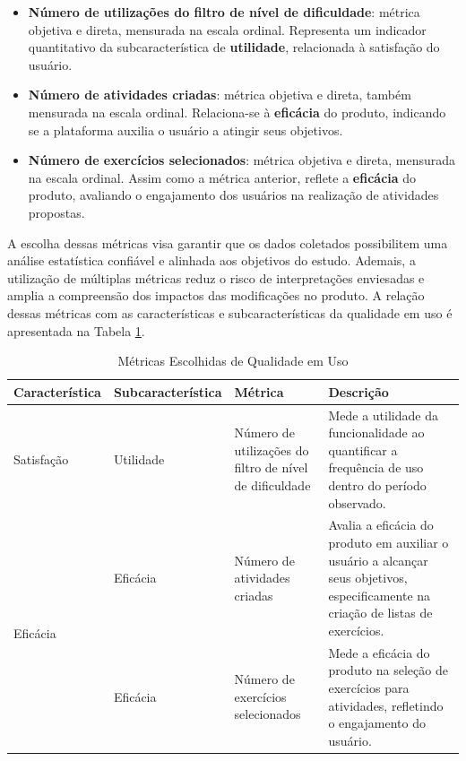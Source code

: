 \begin{itemize}
  \item \textbf{Número de utilizações do filtro de nível de dificuldade}: métrica objetiva e direta, mensurada na escala ordinal. Representa um indicador quantitativo da subcaracterística de \textbf{utilidade}, relacionada à satisfação do usuário.
  \item \textbf{Número de atividades criadas}: métrica objetiva e direta, também mensurada na escala ordinal. Relaciona-se à \textbf{eficácia} do produto, indicando se a plataforma auxilia o usuário a atingir seus objetivos.
  \item \textbf{Número de exercícios selecionados}: métrica objetiva e direta, mensurada na escala ordinal. Assim como a métrica anterior, reflete a \textbf{eficácia} do produto, avaliando o engajamento dos usuários na realização de atividades propostas.
\end{itemize}

A escolha dessas métricas visa garantir que os dados coletados possibilitem uma análise estatística confiável e alinhada aos objetivos do estudo. Ademais, a utilização de múltiplas métricas reduz o risco de interpretações enviesadas e amplia a compreensão dos impactos das modificações no produto. A relação dessas métricas com as características e subcaracterísticas da qualidade em uso é apresentada na Tabela \ref{tab:metricas_qualidade_uso}.

\begin{table}[h]
    \centering
    \renewcommand{\arraystretch}{1.2}
    \setlength{\tabcolsep}{3pt}
    \caption{Métricas Escolhidas de Qualidade em Uso}
    \begin{tabular}{|p{3cm}|p{3.5cm}|p{3.75cm}|p{4.75cm}|}
        \hline
        \textbf{Característica} & \textbf{Subcaracterística} & \textbf{Métrica} & \textbf{Descrição} \\
        \hline
        \multirow{1}{*}{Satisfação} & Utilidade & Número de utilizações do filtro de nível de dificuldade & Mede a utilidade da funcionalidade ao quantificar a frequência de uso dentro do período observado. \\
        \hline
        \multirow{2}{*}{Eficácia} & Eficácia & Número de atividades criadas & Avalia a eficácia do produto em auxiliar o usuário a alcançar seus objetivos, especificamente na criação de listas de exercícios. \\
        \cline{2-4}
        & Eficácia & Número de exercícios selecionados & Mede a eficácia do produto na seleção de exercícios para atividades, refletindo o engajamento do usuário. \\
        \hline
    \end{tabular}
    \label{tab:metricas_qualidade_uso}

    \begin{center}
    \end{center}
\end{table}

